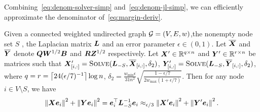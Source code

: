 \documentclass[sigconf]{acmart}
\begin{document}
Combining~\eqref{eq:denom-solver-simp} and~\eqref{eq:denom-jl-simp}, we can efficiently approximate the denominator of~\eqref{eq:margin-deriv}.
\begin{lemma}\label{lem:approx-denom}
  Given a connected weighted undirected graph \(\mathcal{G}=(V,E,w)\),the nonempty node set \(S\) , the Laplacian matrix \(\boldsymbol{L}\) and an error parameter \(\epsilon\in(0,1)\).
  Let \(\overline{\boldsymbol{X}}\) and \(\overline{\boldsymbol{Y}}\) denote \(\boldsymbol{Q}\boldsymbol{W}^{1/2}\boldsymbol{B}\) and \(\boldsymbol{R}\boldsymbol{Z}^{1/2}\) respectively.
  Let \(\boldsymbol{X}'\in\mathbb{R}^{q\times n}\) and \(\boldsymbol{Y}'\in\mathbb{R}^{r\times n}\) be matrices such that \(\boldsymbol{X}'_{[i,:]}=\textsc{Solve}(\boldsymbol{L}_{-S},\overline{\boldsymbol{X}}_{[i,:]},\delta_2)\), \(\boldsymbol{Y}'_{[i,:]}=\textsc{Solve}(\boldsymbol{L}_{-S},\overline{\boldsymbol{Y}}_{[i,:]},\delta_2)\), where \(q=r=\left\lceil24(\epsilon/7)^{-1}\right\rceil\log n\), \(\delta_2=\frac{w_{\min}\epsilon}{31n^2}\sqrt{\frac{1-\epsilon/7}{2w_{\max}(1+\epsilon/7)}}\). Then for any node \(i\in V\setminus S\), we have
  \begin{equation}\label{eq:approx-denom}
    \left\Vert\boldsymbol{X}\boldsymbol{e}_i\right\Vert^2+\left\Vert\boldsymbol{Y}\boldsymbol{e}_i\right\Vert^2=\boldsymbol{e}_i^\top\boldsymbol{L}_{-S}^{-1}\boldsymbol{e}_i\approx_{\epsilon/3}\left\Vert\boldsymbol{X}'\boldsymbol{e}_i\right\Vert^2+\left\Vert\boldsymbol{Y}'\boldsymbol{e}_i\right\Vert^2.
  \end{equation}
\end{lemma}
\end{document}
